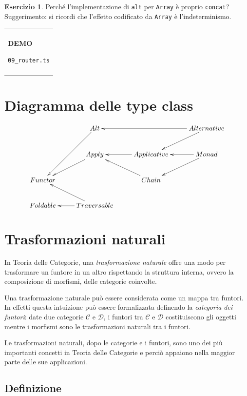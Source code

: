 \documentclass[12pt]{article}
\theoremstyle{definition}
\newtheorem{exercise}{Esercizio}[section]
\newenvironment{demo}
    {\begin{center}
    \begin{tabular}{|p{0.9\textwidth}|}
    \hline\\
    }
    {
    \\\\\hline
    \end{tabular}
    \end{center}
    }
\begin{document}
\begin{exercise}
Perché l'implementazione di \texttt{alt} per \texttt{Array} è proprio \texttt{concat}?
Suggerimento: si ricordi che l'effetto codificato da \texttt{Array} è l'indeterminismo.
\end{exercise}

\begin{demo}
\begin{center}
\textbf{DEMO}

\texttt{09\_router.ts}
\end{center}
\end{demo}

\newpage

\section{Diagramma delle type class}

\[
\xymatrix{
  & Alt \ar[ldd] & & Alternative \ar[ll] \ar[ld] \\
  & Apply \ar[ld] & Applicative \ar[l] & Monad \ar[l] \ar[ld] \\
  Functor & & Chain \ar[lu] \\
  Foldable & Traversable \ar[l] \ar[ul] \\
}
\]

\newpage

\section{Trasformazioni naturali}

In Teoria delle Categorie, una \emph{trasformazione naturale} offre una modo per trasformare un funtore in un altro rispettando
la struttura interna, ovvero la composizione di morfismi, delle categorie coinvolte.

Una trasformazione naturale può essere considerata come un mappa tra funtori. In effetti questa intuizione può essere formalizzata
definendo la \emph{categoria dei funtori}: date due categorie $\mathcal{C}$ e $\mathcal{D}$, i funtori tra $\mathcal{C}$ e $\mathcal{D}$
costituiscono gli oggetti mentre i morfismi sono le trasformazioni naturali tra i funtori.

Le trasformazioni naturali, dopo le categorie e i funtori, sono uno dei più importanti concetti in Teoria delle Categorie e perciò appaiono
nella maggior parte delle sue applicazioni.

\subsection{Definizione}
\end{document}
